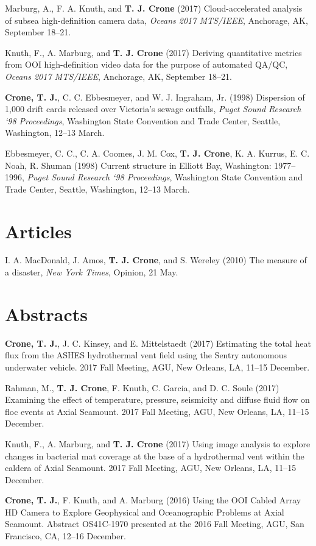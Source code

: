 \documentclass[11pt]{res}
\begin{document}
\begin{resume}
Marburg, A., F. A. Knuth, and {\bf T. J. Crone} (2017) Cloud-accelerated analysis of subsea high-definition camera data, \textit{Oceans 2017 MTS/IEEE}, Anchorage, AK, September 18--21.

Knuth, F., A. Marburg, and {\bf T. J. Crone} (2017) Deriving quantitative metrics from OOI high-definition video data for the purpose of automated QA/QC, \textit{Oceans 2017 MTS/IEEE}, Anchorage, AK, September 18--21.

{\bf Crone, T. J.}, C. C. Ebbesmeyer,
and W. J. Ingraham, Jr. (1998) Dispersion of 1,000 drift cards released over Victoria's sewage outfalls, {\em Puget Sound Research `98 Proceedings}, Washington State Convention and Trade Center, Seattle, Washington, 12--13 March.

Ebbesmeyer, C. C., C. A. Coomes, J. M. Cox, {\bf T. J. Crone}, K. A. Kurrus, E. C. Noah, R. Shuman (1998) Current structure in Elliott Bay, Washington: 1977--1996, {\em Puget Sound Research `98 Proceedings}, Washington State Convention and Trade Center, Seattle, Washington, 12--13 March.

\section{\sc Articles} I. A. MacDonald, J. Amos, {\bf T. J. Crone}, and S. Wereley (2010) The measure of a disaster, {\em New York Times}, Opinion, 21 May.

\section{\sc Abstracts}

{\bf Crone, T. J.}, J. C. Kinsey, and E. Mittelstaedt (2017) Estimating the total heat flux from the ASHES hydrothermal vent field using the Sentry autonomous underwater vehicle. 2017 Fall Meeting, AGU, New Orleans, LA, 11--15 December.

Rahman, M., {\bf T. J. Crone}, F. Knuth, C. Garcia, and D. C. Soule (2017) Examining the effect of temperature, pressure, seismicity and diffuse fluid flow on floc events at Axial Seamount. 2017 Fall Meeting, AGU, New Orleans, LA, 11--15 December.

Knuth, F., A. Marburg, and {\bf T. J. Crone} (2017) Using image analysis to explore changes in bacterial mat coverage at the base of a hydrothermal vent within the caldera of Axial Seamount. 2017 Fall Meeting, AGU, New Orleans, LA, 11--15 December.

{\bf Crone, T. J.}, F. Knuth, and A. Marburg (2016) Using the OOI Cabled Array HD Camera to Explore Geophysical and Oceanographic Problems at Axial Seamount. Abstract OS41C-1970 presented at the 2016 Fall Meeting, AGU, San Francisco, CA, 12--16 December.


\end{resume}
\end{document}
